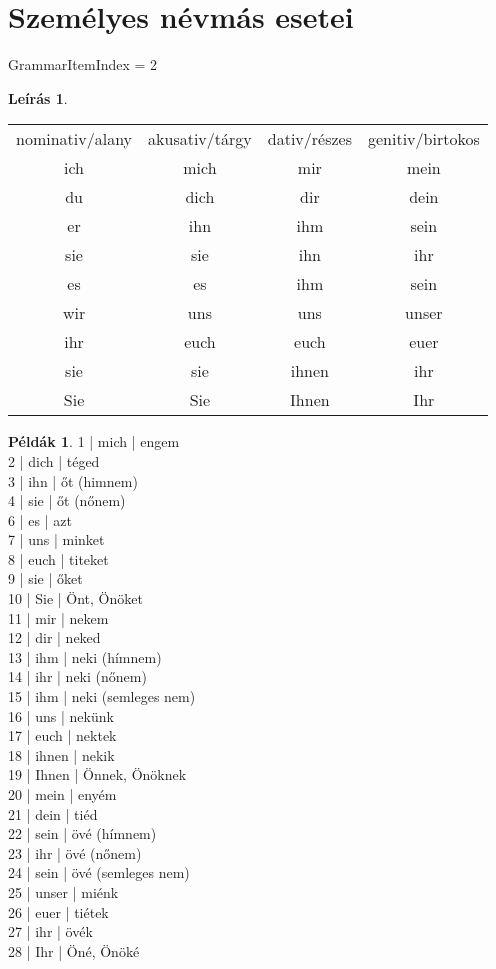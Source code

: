 \documentclass{article}
\theoremstyle{definition}
\newtheorem*{exmp}{Példák}
\newtheorem*{desc}{Leírás}
\begin{document}
\section{Személyes névmás esetei}

GrammarItemIndex = 2

\begin{desc}
\begin{tabular}{cccc}
 nominativ/alany & akusativ/tárgy & dativ/részes & genitiv/birtokos \\
 ich & mich & mir & mein \\
 du & dich & dir & dein \\
 er & ihn & ihm & sein \\
 sie & sie & ihn & ihr \\
 es & es & ihm & sein \\
 wir & uns & uns & unser \\
 ihr & euch & euch & euer \\
 sie & sie & ihnen & ihr \\
 Sie & Sie & Ihnen & Ihr \\
\end{tabular}
\end{desc}

\begin{exmp}
1 | mich | engem\\
2 | dich | téged\\
3 | ihn | őt (himnem)\\
4 | sie | őt (nőnem)\\
6 | es | azt\\
7 | uns | minket\\
8 | euch | titeket\\
9 | sie | őket\\
10 | Sie | Önt, Önöket\\
11 | mir | nekem\\
12 | dir | neked\\
13 | ihm | neki (hímnem)\\
14 | ihr | neki (nőnem)\\
15 | ihm | neki (semleges nem)\\
16 | uns | nekünk\\
17 | euch | nektek\\
18 | ihnen | nekik\\
19 | Ihnen | Önnek, Önöknek\\
20 | mein | enyém\\
21 | dein | tiéd\\
22 | sein | övé (hímnem)\\
23 | ihr | övé (nőnem)\\
24 | sein | övé (semleges nem)\\
25 | unser | miénk\\
26 | euer | tiétek\\
27 | ihr | övék\\
28 | Ihr | Öné, Önöké\\
\end{exmp}
\end{document}
